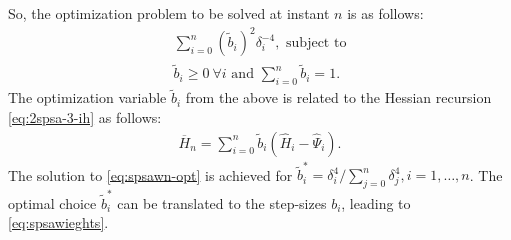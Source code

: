 So, the optimization problem to be solved at instant $n$ is as follows:
\begin{align}
\sum \limits_{i=0}^{n} (\tilde b_i)^2 \delta_i^{-4}, \text{ subject to} \label{eq:spsawn-opt}\\
\tilde b_i \geq 0 ~\forall i \text{ and }\sum \limits_{i=0}^{n} \tilde b_i = 1.
\end{align}
The optimization variable $\tilde b_i$ from the above is related to the Hessian recursion \eqref{eq:2spsa-3-ih} as follows:
\begin{align}
\label{eq:spsahess}
\overline H_n = \sum\limits_{i=0}^{n} \tilde b_i(\widehat H_i -\widehat \Psi_i).
\end{align}
The solution to \eqref{eq:spsawn-opt} is achieved for $\tilde b_i^* = \delta_i^{4}/\sum \limits_{j=0}^{n} \delta_j^{4}, i=1,\ldots,n$. The optimal choice $\tilde b_i^*$ can be translated to the step-sizes $b_i$, leading to \eqref{eq:spsawieghts}.



